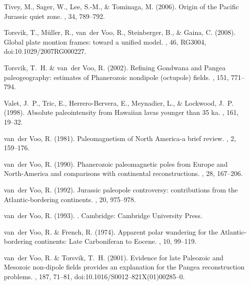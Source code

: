 Tivey, M., Sager, W., Lee, S.-M., \& Tominaga, M. (2006).
\newblock Origin of the Pacific Jurassic quiet zone.
, 34, 789--792.

Torsvik, T., M\"uller, R., van~der Voo, R., Steinberger, B., \& Gaina, C.
  (2008).
\newblock Global plate montion frames: toward a unified model.
, 46, RG3004, doi:10.1029/2007RG000227.

Torsvik, T.~H. \& van~der Voo, R. (2002).
\newblock Refining Gondwana and Pangea paleogeography: estimates of Phanerozoic
  nondipole (octupole) fields.
, 151, 771--794.

Valet, J.~P., Tric, E., Herrero-Bervera, E., Meynadier, L., \& Lockwood, J.~P.
  (1998).
\newblock Absolute paleointensity from Hawaiian lavas younger than 35 ka.
, 161, 19--32.

van~der Voo, R. (1981).
\newblock Paleomagnetism of North America-a brief review.
, 2, 159--176.

van~der Voo, R. (1990).
\newblock Phanerozoic paleomagnetic poles from Europe and North-America and
  comparisons with continental reconstructions.
, 28, 167--206.

van~der Voo, R. (1992).
\newblock Jurassic paleopole controversy: contributions from the
  Atlantic-bordering continents.
, 20, 975--978.

van~der Voo, R. (1993).
.
\newblock Cambridge: Cambridge University Press.

van~der Voo, R. \& French, R. (1974).
\newblock Apparent polar wandering for the Atlantic-bordering continents: Late
  Carboniferan to Eocene.
, 10, 99--119.

van~der Voo, R. \& Torsvik, T.~H. (2001).
\newblock Evidence for late Paleozoic and Mesozoic non-dipole fields provides
  an explanation for the Pangea reconstruction problems.
, 187, 71--81,
  doi:10.1016/S0012--821X(01)00285--0.

